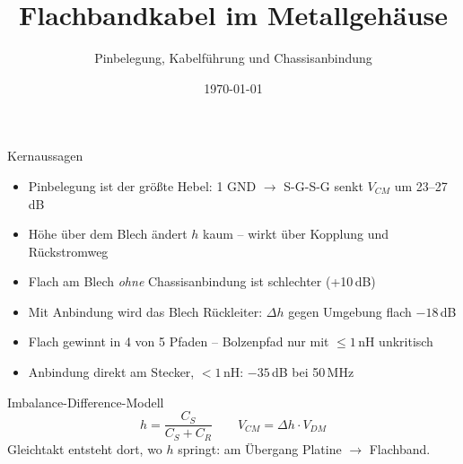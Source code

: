\documentclass[aspectratio=169,11pt]{beamer}
\title{Flachbandkabel im Metallgehäuse}
\subtitle{Pinbelegung, Kabelführung und Chassisanbindung}
\date{\today}
\begin{document}
\frame{\titlepage}

\begin{frame}{Kernaussagen}
\begin{itemize}
  \item Pinbelegung ist der größte Hebel: 1 GND $\to$ S-G-S-G senkt $V_{CM}$ um 23--27\,dB
  \item Höhe über dem Blech ändert $h$ kaum -- wirkt über Kopplung und Rückstromweg
  \item Flach am Blech \emph{ohne} Chassisanbindung ist schlechter (+10\,dB)
  \item Mit Anbindung wird das Blech Rückleiter: $\Delta h$ gegen Umgebung flach $-18$\,dB
  \item Flach gewinnt in 4 von 5 Pfaden -- Bolzenpfad nur mit $\le 1$\,nH unkritisch
  \item Anbindung direkt am Stecker, $<1$\,nH: $-35$\,dB bei 50\,MHz
\end{itemize}
\end{frame}

\begin{frame}{Imbalance-Difference-Modell}
\[ h = \frac{C_S}{C_S + C_R} \qquad V_{CM} = \Delta h \cdot V_{DM} \]
Gleichtakt entsteht dort, wo $h$ springt: am Übergang Platine $\to$ Flachband.
\end{frame}
\end{document}
